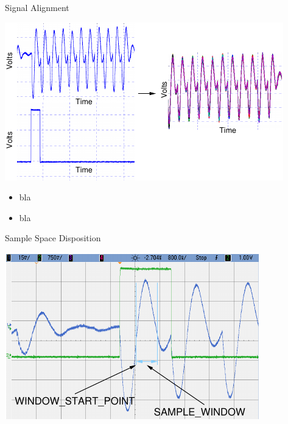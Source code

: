 \documentclass[final]{beamer}
\begin{document}
\begin{frame}[fragile]{}
\begin{columns}[t]
\begin{column}{.31\linewidth}
\begin{block}{Signal Alignment}
\begin{minipage}[t]{0.49\linewidth}
          \includegraphics[scale=2.0]{../figures/alignedTraces}
        \end{minipage}%
        \begin{minipage}[t]{0.49\linewidth}
         \begin{itemize}
           \item bla
           \item bla
         \end{itemize} 
        \end{minipage}
       \end{block}
       \begin{block}{Sample Space Disposition}
        \begin{minipage}[t]{0.49\linewidth}%
          \includegraphics[width=0.9\linewidth]{../figures/oscilloscope-sample-window}
        \end{minipage}%
        \begin{minipage}[t]{0.49\linewidth}%
          \vspace{-6cm}%
          \begin{itemize}

\end{itemize}
\end{minipage}
\end{block}
\end{column}
\end{columns}
\end{frame}
\end{document}
